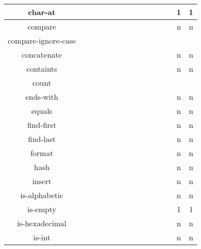 \documentclass[anonymous,sigplan,review,11pt,nonacm,natbib=false]{acmart}
\begin{document}
\begin{table*}[]
\begin{tabular}{|c||c|c|c|c|c|c|c|c|c|c|c|c|c|c|}
            char-at &  &  &  &  &  &  &  &  &  &  &  &  & 1 & 1 \\ \hline

            compare &  &  &  &  &  &  &  &  &  &  &  &  & n & n \\ \hline

            compare-ignore-case &  &  &  &  &  &  &  &  &  &  &  &  &  & \\ \hline

            concatenate &  &  &  &  &  &  &  &  &  &  &  &  & n & n \\ \hline

            containts &  &  &  &  &  &  &  &  &  &  &  &  & n & n \\ \hline

            count &  &  &  &  &  &  &  &  &  &  &  &  &  & \\ \hline

            ends-with &  &  &  &  &  &  &  &  &  &  &  &  & n & n \\ \hline

            equals &  &  &  &  &  &  &  &  &  &  &  &  & n & n \\ \hline

            find-first &  &  &  &  &  &  &  &  &  &  &  &  & n & n \\ \hline

            find-last &  &  &  &  &  &  &  &  &  &  &  &  & n & n \\ \hline

            format &  &  &  &  &  &  &  &  &  &  &  &  & n & n \\ \hline

            hash &  &  &  &  &  &  &  &  &  &  &  &  & n & n \\ \hline

            insert &  &  &  &  &  &  &  &  &  &  &  &  & n & n \\ \hline

            is-alphabetic &  &  &  &  &  &  &  &  &  &  &  &  & n & n \\ \hline

            is-empty &  &  &  &  &  &  &  &  &  &  &  &  & 1 & 1 \\ \hline

            is-hexadecimal &  &  &  &  &  &  &  &  &  &  &  &  & n & n \\ \hline

            is-int &  &  &  &  &  &  &  &  &  &  &  &  & n & n \\ \hline


\end{tabular}
\end{table*}
\end{document}

